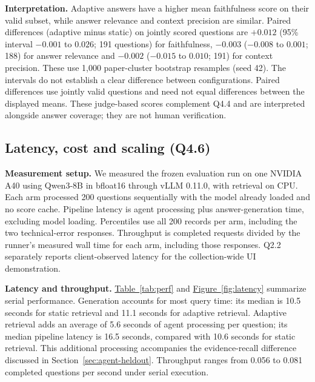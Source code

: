 \begin{samepage}
\textbf{Interpretation.} Adaptive answers have a higher mean faithfulness score on their valid subset, while answer relevance and context precision are similar. Paired differences (adaptive minus static) on jointly scored questions are $+0.012$ (95\% interval $-0.001$ to $0.026$; 191 questions) for faithfulness, $-0.003$ ($-0.008$ to $0.001$; 188) for answer relevance and $-0.002$ ($-0.015$ to $0.010$; 191) for context precision. These use 1,000 paper-cluster bootstrap resamples (seed 42). The intervals do not establish a clear difference between configurations. Paired differences use jointly valid questions and need not equal differences between the displayed means. These judge-based scores complement Q4.4 and are interpreted alongside answer coverage; they are not human verification.\par
\end{samepage}

% 

\subsection{Latency, cost and scaling (Q4.6)}
\textbf{Measurement setup.} We measured the frozen evaluation run on one NVIDIA A40 using Qwen3-8B in bfloat16 through vLLM 0.11.0, with retrieval on CPU. Each arm processed 200 questions sequentially with the model already loaded and no score cache. Pipeline latency is agent processing plus answer-generation time, excluding model loading. Percentiles use all 200 records per arm, including the two technical-error responses. Throughput is completed requests divided by the runner's measured wall time for each arm, including those responses. Q2.2 separately reports client-observed latency for the collection-wide UI demonstration.

\textbf{Latency and throughput.} \hyperref[tab:perf]{Table~\ref*{tab:perf}} and \hyperref[fig:latency]{Figure~\ref*{fig:latency}} summarize serial performance. Generation accounts for most query time: its median is 10.5 seconds for static retrieval and 11.1 seconds for adaptive retrieval. Adaptive retrieval adds an average of 5.6 seconds of agent processing per question; its median pipeline latency is 16.5 seconds, compared with 10.6 seconds for static retrieval. This additional processing accompanies the evidence-recall difference discussed in Section~\ref{sec:agent-heldout}. Throughput ranges from 0.056 to 0.081 completed questions per second under serial execution.


